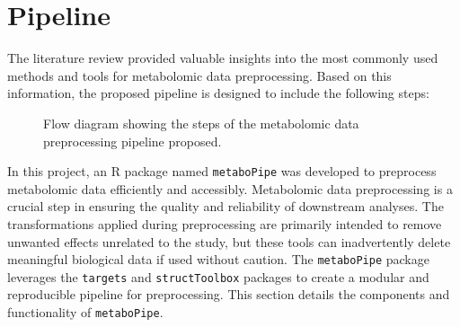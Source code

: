 \documentclass[ENG, BIB]{TFUOC}%
\begin{document}
\section{Pipeline}
The literature review provided valuable insights into the most commonly used methods and tools for metabolomic data preprocessing. Based on this information, the proposed pipeline is designed to include the following steps:
\begin{figure}[ht]
    \centering
    \caption{Flow diagram showing the steps of the metabolomic data preprocessing pipeline proposed.}
    \label{fig:pipeline}
\end{figure}

In this project, an R package named \texttt{metaboPipe} was developed to preprocess metabolomic data efficiently and accessibly. Metabolomic data preprocessing is a crucial step in ensuring the quality and reliability of downstream analyses. The transformations applied during preprocessing are primarily intended to remove unwanted effects unrelated to the study, but these tools can inadvertently delete meaningful biological data if used without caution. The \texttt{metaboPipe} package leverages the \texttt{targets} and \texttt{structToolbox} packages to create a modular and reproducible pipeline for preprocessing. This section details the components and functionality of \texttt{metaboPipe}.
\end{document}
